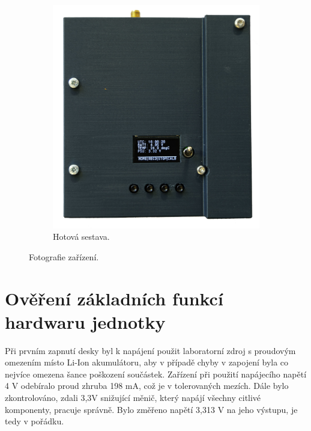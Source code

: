 \begin{figure}
\begin{subfigure}[b]{0.4\textwidth}
     \end{subfigure}
     \hfill
     \begin{subfigure}[b]{0.4\textwidth}
         \centering
         \includegraphics[width=\textwidth]{obrazky/ImunavFront}
         \caption{Hotová sestava.}
         
     \end{subfigure}
        \caption{Fotografie zařízení.}
        \label{fig:boxPhoto}
\end{figure}

\section{Ověření základních funkcí hardwaru jednotky}
Při prvním zapnutí desky byl k napájení použit laboratorní zdroj s proudovým omezením místo Li-Ion akumulátoru, aby v případě chyby v zapojení byla co nejvíce omezena šance poškození součástek. Zařízení při použití napájecího napětí 4 V odebíralo proud zhruba 198 mA, což je v tolerovaných mezích. Dále bylo zkontrolováno, zdali 3,3V snižující měnič, který napájí všechny citlivé komponenty, pracuje správně. Bylo změřeno napětí 3,313 V na jeho výstupu, je tedy v pořádku.

